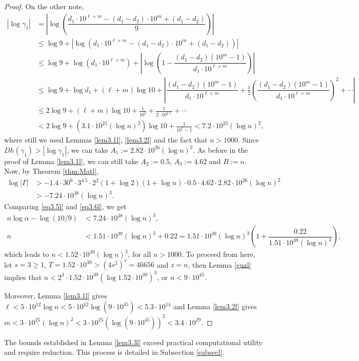 \begin{proof}
	On the other note,  
	\begin{align*}
		|\log \gamma_1 |&=\left|\log\left(\dfrac{d_1\cdot 10^{\ell+m}-(d_1-d_2)\cdot 10^{m}+(d_1-d_2)}{9}\right)\right| \\
		&\le \log 9+\left|\log (d_1\cdot 10^{\ell+m}-(d_1-d_2)\cdot 10^{m}+(d_1-d_2))\right|\\
		&\le  \log 9+\log \left(d_1\cdot 10^{\ell+m}\right)+\left|\log \left(1-\dfrac{(d_1-d_2)(10^m-1)}{d_1\cdot 10^{\ell+m}}\right)\right|\\
		&\leq \log 9 + \log d_1+(\ell+m) \log 10   + \left| \dfrac{(d_1-d_2)(10^m-1)}{d_1\cdot 10^{\ell+m}} + \frac{1}{2} \left( \dfrac{(d_1-d_2)(10^m-1)}{d_1\cdot 10^{\ell+m}} \right)^2 + \cdots \right| \\
		&\leq 2\log 9+(\ell+m)  \log 10  + \frac{1}{10^\ell} + \frac{1}{2 \cdot 10^{2\ell}} + \cdots \\
		&< 2\log 9+ \left(3.1\cdot 10^{25}(\log n)^2\right)\log 10 + \frac{1}{10^\ell - 1} < 7.2 \cdot 10^{25}  (\log n)^2,	
	\end{align*}
	where still we used Lemmas \ref{lem3.1l}, \ref{lem3.2l} and the fact that $n>1000$. Since $Dh(\gamma_{1})>|\log \gamma_1 |$, we can take $A_1:=2.82\cdot 10^{26}(\log n)^2$. As before in the proof of Lemma \ref{lem3.1l}, we can still take $A_2:=0.5$, $A_3:=4.62$ and $B:=n$. Now, by Theorem \ref{thm:Matl},
	\begin{align}\label{eq3.6l}
		\log |\Gamma| &> -1.4\cdot 30^{6} \cdot 3^{4.5}\cdot 2^2 (1+\log 2)(1+\log n)\cdot 0.5\cdot 4.62\cdot 2.82\cdot 10^{26}(\log n)^2\nonumber\\
		&> -7.24\cdot 10^{38}(\log n)^3.
	\end{align}
	Comparing \eqref{eq3.5l} and \eqref{eq3.6l}, we get
	\begin{align*}
		n\log\alpha-\log (10/9)&<7.24\cdot 10^{38}(\log n)^3,\\
		n&<1.51\cdot 10^{39}(\log n)^3+0.22
		=1.51\cdot 10^{39}(\log n)^3\left(1+\dfrac{0.22}{1.51\cdot 10^{39}(\log n)^3}\right),
	\end{align*}
	which leads to $n<1.52\cdot 10^{39}(\log n)^3$, for all $n>1000$. 	To proceed from here, let $ s =3\geq 1 $, $T =1.52\cdot 10^{39}> (4s^2)^s=46656$ and $z=n$, then Lemma \ref{guzl} implies that $n < 2^3 \cdot 1.52\cdot 10^{39} (\log 1.52\cdot 10^{39})^3$, or $n<9\cdot 10^{45}$.	
	
Moreover, Lemma \ref{lem3.1l} gives $\ell<5\cdot 10^{12}\log n<5\cdot 10^{12}\log (9\cdot 10^{45})<5.3\cdot 10^{14}$ and Lemma \ref{lem3.2l} gives $m<3\cdot 10^{25}(\log n)^2<3\cdot 10^{25}(\log (9\cdot 10^{45}))^2<3.4\cdot 10^{29}$.
\end{proof}
The bounds established in Lemma \ref{lem3.3l} exceed practical computational utility and require reduction. This process is detailed in Subsection \ref{subsecl}.

